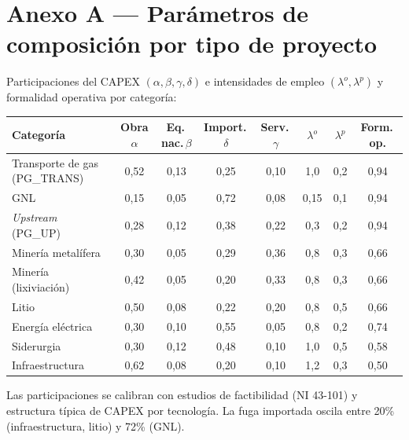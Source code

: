 \documentclass[11pt]{article}
\begin{document}

\appendix
\section{Anexo A --- Parámetros de composición por tipo de proyecto}
Participaciones del CAPEX $(\alpha,\beta,\gamma,\delta)$ e intensidades de empleo $(\lambda^o,\lambda^p)$ y formalidad operativa por categoría:
\begin{center}\footnotesize
\begin{tabular}{lcccccc c}
\toprule
Categoría & Obra $\alpha$ & Eq.\,nac.\,$\beta$ & Import.\,$\delta$ & Serv.\,$\gamma$ & $\lambda^o$ & $\lambda^p$ & Form.\,op. \\
\midrule
Transporte de gas (PG\_TRANS) & 0{,}52 & 0{,}13 & 0{,}25 & 0{,}10 & 1{,}0 & 0{,}2 & 0{,}94\\
GNL & 0{,}15 & 0{,}05 & 0{,}72 & 0{,}08 & 0{,}15 & 0{,}1 & 0{,}94\\
\emph{Upstream} (PG\_UP) & 0{,}28 & 0{,}12 & 0{,}38 & 0{,}22 & 0{,}3 & 0{,}2 & 0{,}94\\
Minería metalífera & 0{,}30 & 0{,}05 & 0{,}29 & 0{,}36 & 0{,}8 & 0{,}3 & 0{,}66\\
Minería (lixiviación) & 0{,}42 & 0{,}05 & 0{,}20 & 0{,}33 & 0{,}8 & 0{,}3 & 0{,}66\\
Litio & 0{,}50 & 0{,}08 & 0{,}22 & 0{,}20 & 0{,}8 & 0{,}5 & 0{,}66\\
Energía eléctrica & 0{,}30 & 0{,}10 & 0{,}55 & 0{,}05 & 0{,}8 & 0{,}2 & 0{,}74\\
Siderurgia & 0{,}30 & 0{,}12 & 0{,}48 & 0{,}10 & 1{,}0 & 0{,}5 & 0{,}58\\
Infraestructura & 0{,}62 & 0{,}08 & 0{,}20 & 0{,}10 & 1{,}2 & 0{,}3 & 0{,}50\\
\bottomrule
\end{tabular}
\end{center}
\noindent Las participaciones se calibran con estudios de factibilidad (NI 43-101) y estructura típica de CAPEX por tecnología. La fuga importada oscila entre 20\% (infraestructura, litio) y 72\% (GNL).
\end{document}
